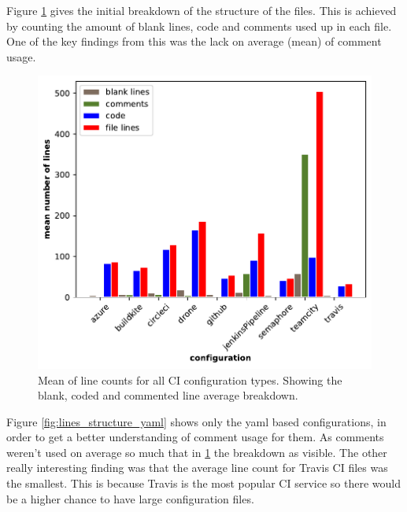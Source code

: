 \documentclass[10pt,conference]{IEEEtran}
\begin{document}



Figure \ref{fig:lines_structure_all} gives the initial breakdown of the structure of the files. This is achieved by counting the amount of blank lines, code and comments used up in each file. One of the key findings from this was the lack on average (mean) of comment usage. 

\begin{figure}[!ht]
  \centering
  \includegraphics[width=\textwidth]{../src/results/line structure all.pdf}
  \caption[alt text]{Mean of line counts for all CI configuration types. Showing the blank, coded and commented line average breakdown.}
  \label{fig:lines_structure_all}
\end{figure}

Figure \ref{fig:lines_structure_yaml} shows only the yaml based configurations, in order to get a better understanding of comment usage for them. As comments weren't used on average so much that in \ref{fig:lines_structure_all} the breakdown as visible. The other really interesting finding was that the average line count for Travis CI files was the smallest. This is because Travis is the most popular CI service so there would be a higher chance to have large configuration files. 
\end{document}
